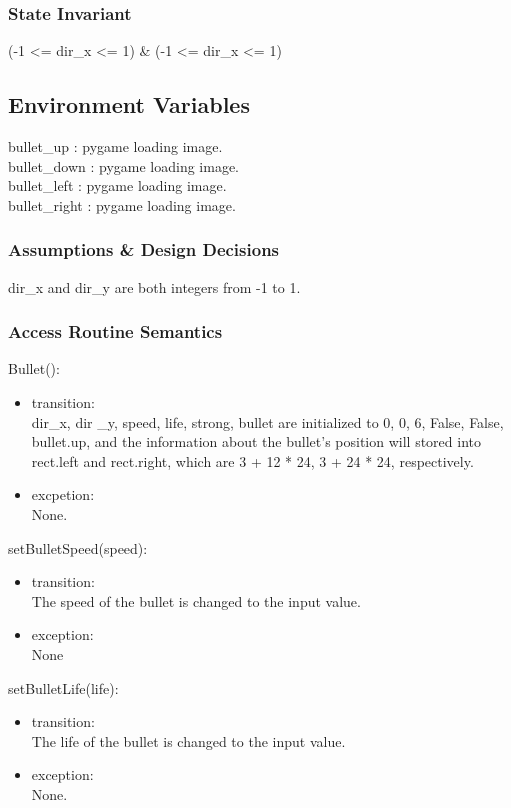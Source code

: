 \documentclass[12pt, titlepage]{article}
\begin{document}
		\subsubsection{State Invariant}
		(-1 <= dir\_x <= 1) \& (-1 <= dir\_x <= 1)
		\subsection{Environment Variables}
		bullet\_up : pygame loading image.\\
		bullet\_down : pygame loading image.\\
		bullet\_left : pygame loading image.\\
		bullet\_right : pygame loading image.
		\subsubsection{Assumptions \& Design Decisions}
		dir\_x and dir\_y are both integers from -1 to 1.
		\subsubsection{Access Routine Semantics}
		Bullet():
		\begin{itemize}
		\item transition:\\dir\_x, dir \_y, speed, life, strong, bullet are initialized to 0, 0, 6, False, False, bullet.up, and the information about the bullet's position will stored into rect.left and rect.right, which are 3 + 12 * 24, 3 + 24 * 24, respectively.
		
		\item excpetion:\\ None.
		\end{itemize}
	    setBulletSpeed(speed):
	    \begin{itemize}
	    \item transition:\\The speed of the bullet is changed to the input value.
	    
	    \item exception:\\ None
	    \end{itemize}
	    setBulletLife(life):
	    \begin{itemize}
	    \item transition:\\ The life of the bullet is changed to the input value.
	    \item exception:\\None.
	    \end{itemize}
\end{document}
